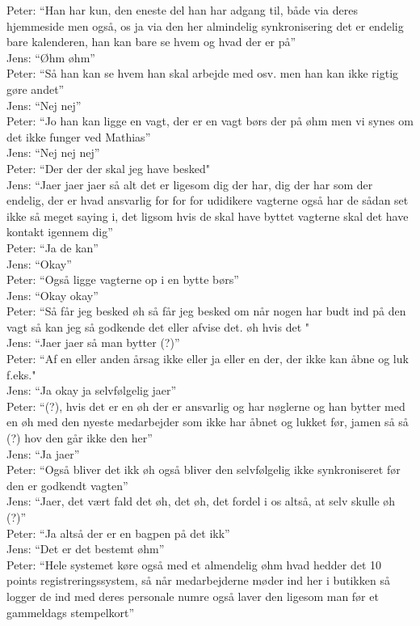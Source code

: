 Peter: “Han har kun, den eneste del han har adgang til, både via deres hjemmeside men også, os ja via den her almindelig synkronisering det er endelig bare kalenderen, han kan bare se hvem og hvad der er på”\\
Jens: “Øhm øhm”\\
Peter: “Så han kan se hvem han skal arbejde med osv. men han kan ikke rigtig gøre andet”\\
Jens: “Nej nej”\\
Peter: “Jo han kan ligge en vagt, der er en vagt børs der på øhm men vi synes om det ikke funger ved Mathias”\\
Jens: “Nej nej nej”\\
Peter: “Der der der skal jeg have besked"\\
Jens: “Jaer jaer jaer så alt det er ligesom dig der har, dig der har som der endelig, der er hvad ansvarlig for for for udidikere vagterne også har de sådan set ikke så  meget saying i, det ligsom hvis de skal have byttet vagterne skal det have kontakt igennem dig”\\
Peter: “Ja de kan”\\
Jens: “Okay”\\
Peter: “Også ligge vagterne op i en bytte børs”\\
Jens: “Okay okay”\\
Peter: “Så får jeg besked øh så får jeg besked om når nogen har budt ind på den vagt så kan jeg så godkende det eller afvise det. øh hvis det "\\
Jens: “Jaer jaer så man bytter (?)”\\
Peter: “Af en eller anden årsag ikke eller ja eller en der, der ikke kan åbne og luk f.eks."\\
Jens: “Ja okay ja selvfølgelig jaer”\\
Peter: “(?), hvis det er en øh der er ansvarlig og har nøglerne og han bytter med en øh med den nyeste medarbejder som ikke har åbnet og lukket før, jamen så så (?) hov den går ikke den her”\\
Jens: “Ja jaer”\\
Peter: “Også bliver det ikk øh også bliver den selvfølgelig ikke synkroniseret før den er godkendt vagten”\\
Jens: “Jaer, det vært fald det øh, det øh, det fordel i os altså, at selv skulle øh (?)”\\
Peter: “Ja altså der er en bagpen på det ikk”\\
Jens: “Det er det bestemt øhm”\\
Peter: “Hele systemet køre også med et almendelig øhm hvad hedder det 10 points registreringssystem, så når medarbejderne møder ind her i butikken så logger de ind med deres personale numre også laver den ligesom man før et gammeldags stempelkort”\\
